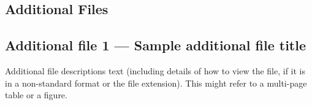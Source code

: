 \documentclass{bmcart}
\begin{document}
\begin{backmatter}
\section*{Additional Files}
  \subsection*{Additional file 1 --- Sample additional file title}
    Additional file descriptions text (including details of how to
    view the file, if it is in a non-standard format or the file extension).  This might
    refer to a multi-page table or a figure.


\end{backmatter}
\end{document}
